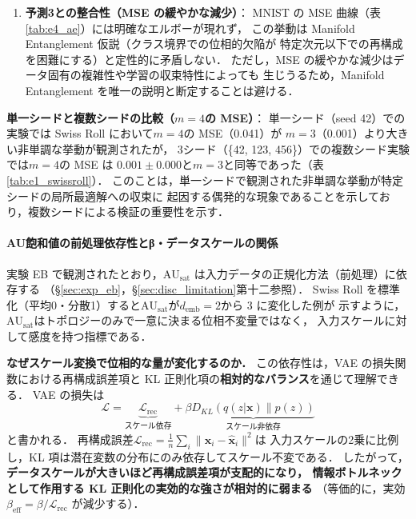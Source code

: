 \documentclass[12pt,a4paper]{jsarticle}
\newcommand{\AUsat}{\mathrm{AU}_{\mathrm{sat}}}
\newcommand{\demb}{d_{\mathrm{emb}}}
\begin{document}
\begin{enumerate}
  \item \textbf{予測3との整合性（MSE の緩やかな減少）}：
        MNIST の MSE 曲線（表\ref{tab:e4_ae}）には明確なエルボーが現れず，
        この挙動は Manifold Entanglement 仮説（クラス境界での位相的欠陥が
        特定次元以下での再構成を困難にする）と定性的に矛盾しない．
        ただし，MSE の緩やかな減少はデータ固有の複雑性や学習の収束特性によっても
        生じうるため，Manifold Entanglement を唯一の説明と断定することは避ける．
\end{enumerate}

\textbf{単一シードと複数シードの比較（$m = 4$の MSE）}：
単一シード（seed 42）での実験では Swiss Roll において$m = 4$の MSE（0.041）が
$m = 3$（0.001）より大きい非単調な挙動が観測されたが，
3シード（\{42, 123, 456\}）での複数シード実験では$m = 4$の MSE は
$0.001\pm0.000$と$m = 3$と同等であった（表\ref{tab:e1_swissroll}）．
このことは，単一シードで観測された非単調な挙動が特定シードの局所最適解への収束に
起因する偶発的な現象であることを示しており，複数シードによる検証の重要性を示す．

\paragraph{AU飽和値の前処理依存性とβ・データスケールの関係}
実験 EB で観測されたとおり，$\AUsat$ は入力データの正規化方法（前処理）に依存する
（§\ref{sec:exp_eb}，§\ref{sec:disc_limitation}第十二参照）．
Swiss Roll を標準化（平均0・分散1）すると$\AUsat$が$\demb = 2$から 3 に変化した例が
示すように，$\AUsat$はトポロジーのみで一意に決まる位相不変量ではなく，
入力スケールに対して感度を持つ指標である．

\textbf{なぜスケール変換で位相的な量が変化するのか．}
この依存性は，VAE の損失関数における再構成誤差項と KL 正則化項の\textbf{相対的なバランス}を通じて理解できる．
VAE の損失は
\begin{equation*}
  \mathcal{L} = \underbrace{\mathcal{L}_{\mathrm{rec}}}_{\text{スケール依存}} +
                \beta \underbrace{D_{KL}(q(z|\boldsymbol{x})\|p(z))}_{\text{スケール非依存}}
\end{equation*}
と書かれる．
再構成誤差$\mathcal{L}_{\mathrm{rec}} = \frac{1}{n}\sum_i \|\boldsymbol{x}_i - \hat{\boldsymbol{x}}_i\|^2$は
入力スケールの2乗に比例し，KL 項は潜在変数の分布にのみ依存してスケール不変である．
したがって，\textbf{データスケールが大きいほど再構成誤差項が支配的になり，
情報ボトルネックとして作用する KL 正則化の実効的な強さが相対的に弱まる}
（等価的に，実効 $\beta_{\mathrm{eff}} = \beta / \mathcal{L}_{\mathrm{rec}}$ が減少する）．
\end{document}
